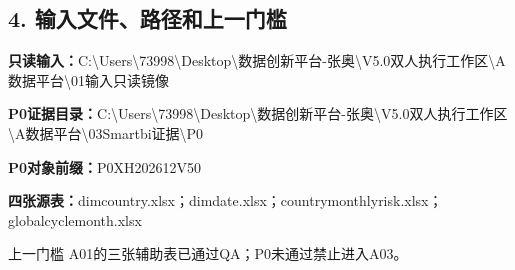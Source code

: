 \documentclass[UTF8,openany,zihao=-4]{ctexbook}
\renewcommand{\_}{\textunderscore\allowbreak}
\begin{document}
\subsection*{4. 输入文件、路径和上一门槛}
\noindent\textbf{只读输入：}{\promptlatin\promptcjk\small C:\textbackslash{}\allowbreak{}Users\textbackslash{}\allowbreak{}73998\textbackslash{}\allowbreak{}Desktop\textbackslash{}\allowbreak{}数据创新平台-\allowbreak{}张奥\textbackslash{}\allowbreak{}V5.0\_\allowbreak{}双人执行工作区\textbackslash{}\allowbreak{}A\_\allowbreak{}数据平台\textbackslash{}\allowbreak{}01\_\allowbreak{}输入只读镜像}\par
\noindent\textbf{P0证据目录：}{\promptlatin\promptcjk\small C:\textbackslash{}\allowbreak{}Users\textbackslash{}\allowbreak{}73998\textbackslash{}\allowbreak{}Desktop\textbackslash{}\allowbreak{}数据创新平台-\allowbreak{}张奥\textbackslash{}\allowbreak{}V5.0\_\allowbreak{}双人执行工作区\textbackslash{}\allowbreak{}A\_\allowbreak{}数据平台\textbackslash{}\allowbreak{}03\_\allowbreak{}Smartbi证据\textbackslash{}\allowbreak{}P0}\par
\noindent\textbf{P0对象前缀：}{\promptlatin\promptcjk\small P0\_\allowbreak{}XH202612\_\allowbreak{}V50}\par
\noindent\textbf{四张源表：}{\promptlatin\promptcjk\small dim\_\allowbreak{}country.xlsx；dim\_\allowbreak{}date.xlsx；country\_\allowbreak{}monthly\_\allowbreak{}risk.xlsx；global\_\allowbreak{}cycle\_\allowbreak{}month.xlsx}\par
\begin{gatebox}{上一门槛}
A01的三张辅助表已通过QA；P0未通过禁止进入A03。

\end{gatebox}
\end{document}
